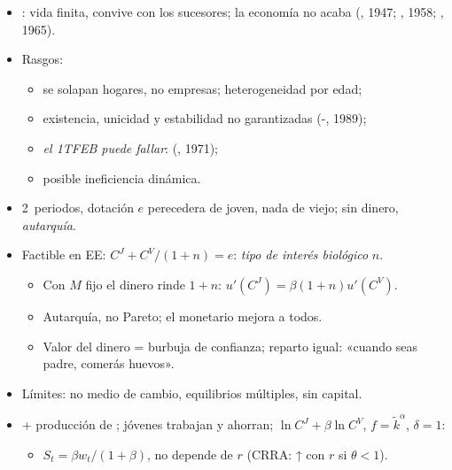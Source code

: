 \documentclass{article}
\begin{document}
\begin{columnas}
\begin{itemize}
\item {}: vida finita, convive con los sucesores; la economía no acaba (, 1947; , 1958; , 1965).
\item Rasgos:
  \begin{itemize}
  \item se solapan hogares, no empresas; heterogeneidad por edad;
  \item existencia, unicidad y estabilidad no garantizadas (-, 1989);
  \item \emph{el 1TFEB puede fallar}:  (, 1971);
  \item posible ineficiencia dinámica.
  \end{itemize}
\end{itemize}
\begin{itemize}
\item 2~periodos, dotación $e$ perecedera de joven, nada de viejo; sin dinero, \emph{autarquía}.
\item Factible en EE: $C^J+C^V/(1+n)=e$: \emph{tipo de interés biológico} $n$.
  \begin{itemize}
  \item Con $M$ fijo el dinero rinde $1+n$: $u'(C^J)=\beta(1+n)u'(C^V)$.
  \item Autarquía, no Pareto; el monetario mejora a todos.
  \item Valor del dinero = burbuja de confianza; reparto igual: «cuando seas padre, comerás huevos».
  \end{itemize}
\item Límites: no medio de cambio, equilibrios múltiples, sin capital.
\end{itemize}
\begin{itemize}
\item {} + producción de ; jóvenes trabajan y ahorran; $\ln C^J+\beta\ln C^V$, $f=\tilde k^\alpha$, $\delta=1$:
  \begin{itemize}
  \item $S_t=\beta w_t/(1+\beta)$, no depende de $r$ (CRRA: ↑ con $r$ si $\theta<1$).

\end{itemize}
\end{itemize}
\end{columnas}
\end{document}
